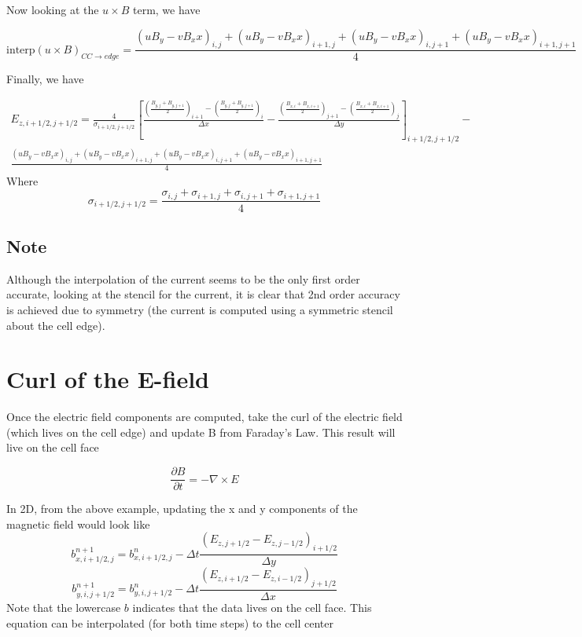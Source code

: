 \documentclass[11pt]{article}
\begin{document}
Now looking at the $u\times B$ term, we have

\begin{equation}
	\text{interp}(u\times B)_{CC \rightarrow edge} = 
	\frac{
	(uB_y-vB_xx)_{i,j} +
	(uB_y-vB_xx)_{i+1,j} +
	(uB_y-vB_xx)_{i,j+1} +
	(uB_y-vB_xx)_{i+1,j+1}
	}{4}
\end{equation}

Finally, we have

\begin{multline}
	E_{z,i+1/2,j+1/2} = 
	\frac{4}{\sigma_{i+1/2,j+1/2}}
	\left[
	\frac{ 
	\left(\frac{B_{y,j}+B_{y,j+1}}{2}\right)_{i+1}-\left(\frac{B_{y,j}+B_{y,j+1}}{2}\right)_{i}
	 }{\Delta x}
	-
	\frac{
	\left(\frac{B_{x,i}+B_{x,i+1}}{2}\right)_{j+1}-\left(\frac{B_{x,i}+B_{x,i+1}}{2}\right)_{j}
	}{\Delta y}
	\right]_{i+1/2,j+1/2}
	- \\
	\frac{
	(uB_y-vB_xx)_{i,j} +
	(uB_y-vB_xx)_{i+1,j} +
	(uB_y-vB_xx)_{i,j+1} +
	(uB_y-vB_xx)_{i+1,j+1}
	}{4}
\end{multline}
Where
\begin{equation}
	\sigma_{i+1/2,j+1/2} = 
	\frac{\sigma_{i,j} + \sigma_{i+1,j} + \sigma_{i,j+1} + \sigma_{i+1,j+1}}{4}
\end{equation}

\subsection{Note}
Although the interpolation of the current seems to be the only first order accurate, looking at the stencil for the current, it is clear that 2nd order accuracy is achieved due to symmetry (the current is computed using a symmetric stencil about the cell edge).

\section{Curl of the E-field}
Once the electric field components are computed, take the curl of the electric field (which lives on the cell edge) and update B from Faraday's Law. This result will live on the cell face

\begin{equation}
	\frac{\partial B}{\partial t} = - \nabla \times E
\end{equation}

In 2D, from the above example, updating the x and y components of the magnetic field would look like
\begin{equation}
	b_{x,i+1/2,j}^{n+1} = b_{x,i+1/2,j}^{n} - 
	\Delta t
	\frac{(E_{z,j+1/2}-E_{z,j-1/2})_{i+1/2}}{\Delta y}
\end{equation}
\begin{equation}
	b_{y,i,j+1/2}^{n+1} = b_{y,i,j+1/2}^{n} - 
	\Delta t
	\frac{(E_{z,i+1/2}-E_{z,i-1/2})_{j+1/2}}{\Delta x}
\end{equation}
Note that the lowercase $b$ indicates that the data lives on the cell face. This equation can be interpolated (for both time steps) to the cell center
\end{document}
